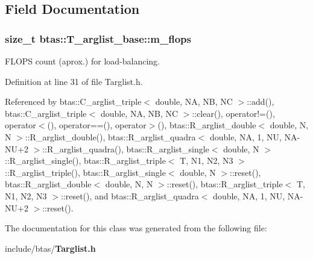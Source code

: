 \subsection{Field Documentation}
\subsubsection[{m\-\_\-flops}]{\setlength{\rightskip}{0pt plus 5cm}size\-\_\-t btas\-::\-T\-\_\-arglist\-\_\-base\-::m\-\_\-flops\hspace{0.3cm}{\ttfamily [protected]}}\label{d7/dd4/classbtas_1_1T__arglist__base_aa1331e5b0a9e296c7648385efcf7ad45}


F\-L\-O\-P\-S count (aprox.) for load-\/balancing. 



Definition at line 31 of file Targlist.\-h.



Referenced by btas\-::\-C\-\_\-arglist\-\_\-triple$<$ double, N\-A, N\-B, N\-C $>$\-::add(), btas\-::\-C\-\_\-arglist\-\_\-triple$<$ double, N\-A, N\-B, N\-C $>$\-::clear(), operator!=(), operator$<$(), operator==(), operator$>$(), btas\-::\-R\-\_\-arglist\-\_\-double$<$ double, N, N $>$\-::\-R\-\_\-arglist\-\_\-double(), btas\-::\-R\-\_\-arglist\-\_\-quadra$<$ double, N\-A, 1, N\-U, N\-A-\/\-N\-U+2 $>$\-::\-R\-\_\-arglist\-\_\-quadra(), btas\-::\-R\-\_\-arglist\-\_\-single$<$ double, N $>$\-::\-R\-\_\-arglist\-\_\-single(), btas\-::\-R\-\_\-arglist\-\_\-triple$<$ T, N1, N2, N3 $>$\-::\-R\-\_\-arglist\-\_\-triple(), btas\-::\-R\-\_\-arglist\-\_\-single$<$ double, N $>$\-::reset(), btas\-::\-R\-\_\-arglist\-\_\-double$<$ double, N, N $>$\-::reset(), btas\-::\-R\-\_\-arglist\-\_\-triple$<$ T, N1, N2, N3 $>$\-::reset(), and btas\-::\-R\-\_\-arglist\-\_\-quadra$<$ double, N\-A, 1, N\-U, N\-A-\/\-N\-U+2 $>$\-::reset().



The documentation for this class was generated from the following file\-:\begin{DoxyCompactItemize}
\item 
include/btas/{\bf Targlist.\-h}\end{DoxyCompactItemize}
